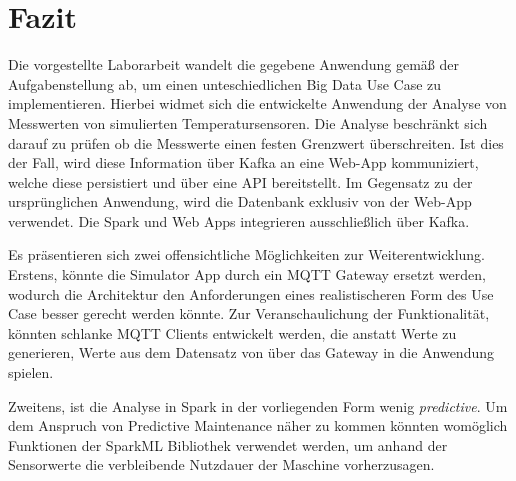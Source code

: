 \section{Fazit}\label{sec:fazit}

Die vorgestellte Laborarbeit wandelt die gegebene Anwendung gemäß der Aufgabenstellung ab, um einen unteschiedlichen Big Data Use Case zu implementieren.
Hierbei widmet sich die entwickelte Anwendung der Analyse von Messwerten von simulierten Temperatursensoren.
Die Analyse beschränkt sich darauf zu prüfen ob die Messwerte einen festen Grenzwert überschreiten.
Ist dies der Fall, wird diese Information über Kafka an eine Web-App kommuniziert, welche diese persistiert und über eine API bereitstellt.
Im Gegensatz zu der ursprünglichen Anwendung, wird die Datenbank exklusiv von der Web-App verwendet.
Die Spark und Web Apps integrieren ausschließlich über Kafka.

Es präsentieren sich zwei offensichtliche Möglichkeiten zur Weiterentwicklung.
Erstens, könnte die Simulator App durch ein MQTT Gateway ersetzt werden, wodurch die Architektur den Anforderungen eines realistischeren Form des Use Case besser gerecht werden könnte.
Zur Veranschaulichung der Funktionalität, könnten schlanke MQTT Clients entwickelt werden, die anstatt Werte zu generieren, Werte aus dem Datensatz von \cite{helwig_condition_2015} über das Gateway in die Anwendung spielen.

Zweitens, ist die Analyse in Spark in der vorliegenden Form wenig \textit{predictive}.
Um dem Anspruch von Predictive Maintenance näher zu kommen könnten womöglich Funktionen der SparkML Bibliothek verwendet werden, um anhand der Sensorwerte die verbleibende Nutzdauer der Maschine vorherzusagen.
